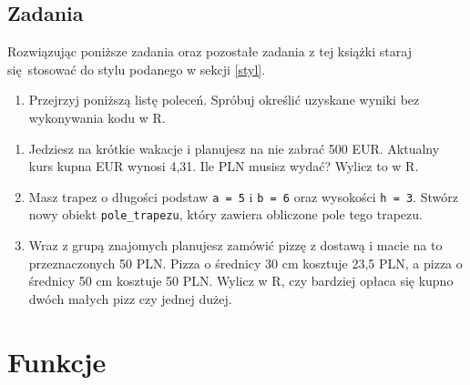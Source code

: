 \documentclass[paper=6in:9in,pagesize=pdftex,headinclude=on,footinclude=on,10pt]{scrbook}
\newenvironment{Shaded}{\begin{snugshade}}{\end{snugshade}}
\newcommand{\DecValTok}[1]{\textcolor[rgb]{0.00,0.00,0.81}{#1}}
\newcommand{\NormalTok}[1]{#1}
\newcommand{\OperatorTok}[1]{\textcolor[rgb]{0.81,0.36,0.00}{\textbf{#1}}}
\newcommand{\StringTok}[1]{\textcolor[rgb]{0.31,0.60,0.02}{#1}}
\providecommand{\tightlist}{%
  \setlength{\itemsep}{0pt}\setlength{\parskip}{0pt}}
\begin{document}
\hypertarget{zadania-1}{%
\section{Zadania}\label{zadania-1}}

Rozwiązując poniższe zadania oraz pozostałe zadania z tej książki staraj się~stosować do stylu podanego w sekcji \ref{styl}.

\begin{enumerate}
\def\labelenumi{\arabic{enumi})}
\tightlist
\item
  Przejrzyj poniższą listę poleceń.
  Spróbuj określić uzyskane wyniki bez wykonywania kodu w R.
\end{enumerate}

\begin{Shaded}
\end{Shaded}

\begin{enumerate}
\def\labelenumi{\arabic{enumi})}
\setcounter{enumi}{1}
\tightlist
\item
  Jedziesz na krótkie wakacje i planujesz na nie zabrać 500 EUR.
  Aktualny kurs kupna EUR wynosi 4,31.
  Ile PLN musisz wydać?
  Wylicz to w R.
\item
  Masz trapez o długości podstaw \texttt{a\ =\ 5} i \texttt{b\ =\ 6} oraz wysokości \texttt{h\ =\ 3}.
  Stwórz nowy obiekt \texttt{pole\_trapezu}, który zawiera obliczone pole tego trapezu.
\item
  Wraz z grupą znajomych planujesz zamówić pizzę z dostawą i macie na to przeznaczonych 50 PLN.
  Pizza o średnicy 30 cm kosztuje 23,5 PLN, a pizza o średnicy 50 cm kosztuje 50 PLN.
  Wylicz w R, czy bardziej opłaca się kupno dwóch małych pizz czy jednej dużej.
\end{enumerate}

\hypertarget{funkcje}{%
\chapter{Funkcje}\label{funkcje}}
\end{document}
